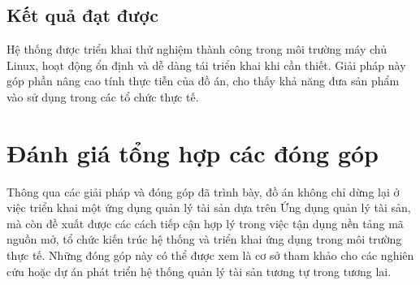 \documentclass[../DoAn.tex]{subfiles}
\begin{document}
\subsection{Kết quả đạt được}

Hệ thống được triển khai thử nghiệm thành công trong môi trường máy chủ Linux, hoạt động ổn định và dễ dàng tái triển khai khi cần thiết. Giải pháp này góp phần nâng cao tính thực tiễn của đồ án, cho thấy khả năng đưa sản phẩm vào sử dụng trong các tổ chức thực tế.

\section{Đánh giá tổng hợp các đóng góp}

Thông qua các giải pháp và đóng góp đã trình bày, đồ án không chỉ dừng lại ở việc triển khai một ứng dụng quản lý tài sản dựa trên Ứng dụng quản lý tài sản, mà còn đề xuất được các cách tiếp cận hợp lý trong việc tận dụng nền tảng mã nguồn mở, tổ chức kiến trúc hệ thống và triển khai ứng dụng trong môi trường thực tế. Những đóng góp này có thể được xem là cơ sở tham khảo cho các nghiên cứu hoặc dự án phát triển hệ thống quản lý tài sản tương tự trong tương lai.
\end{document}
